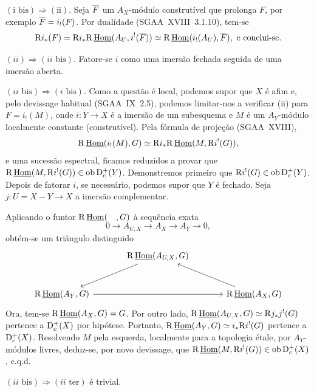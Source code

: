 $(\text{i~bis}) \Rightarrow (\text{ii})$. Seja $\overline{F}$ um $A_X$-módulo construtível que prolonga $F$, por exemplo $\overline{F} = i_{!}(F)$. Por dualidade (SGAA~XVIII~3.1.10), tem-se
\[
\mathrm{R} i_{*}(F) = \mathrm{R} i_{*} \mathrm{R}\,\underline{\operatorname{Hom}}(A_U, i^{!}(\overline{F})) \simeq \mathrm{R}\,\underline{\operatorname{Hom}}(i_{!}(A_U), \overline{F}), \text{ e conclui-se.}
\]

$(ii) \Rightarrow (ii\text{~bis})$. Fatore-se $i$ como uma imersão fechada seguida de uma imersão aberta.

$(ii\text{~bis}) \Rightarrow (i\text{~bis})$. Como a questão é local, podemos supor que $X$ é afim e, pelo devissage habitual (SGAA~IX~2.5), podemos limitar-nos a verificar (ii) para $F = i_{!}(M)$, onde $i : Y \to X$ é a imersão de um subesquema e $M$ é um $A_Y$-módulo localmente constante (construtível). Pela fórmula de projeção (SGAA~XVIII),
\[
\mathrm{R}\,\underline{\operatorname{Hom}}(i_{!}(M), G) \simeq \mathrm{R} i_{*} \mathrm{R}\,\underline{\operatorname{Hom}}(M, \mathrm{R} i^{!}(G)),
\]
e uma sucessão espectral, ficamos reduzidos a provar que $\mathrm{R}\,\underline{\operatorname{Hom}}(M, \mathrm{R} i^{!}(G)) \in \operatorname{ob} \mathrm{D}_c^{+}(Y)$. Demonstremos primeiro que $\mathrm{R} i^{!}(G) \in \operatorname{ob} \mathrm{D}_c^{+}(Y)$. Depois de fatorar $i$, se necessário, podemos supor que $Y$ é fechado. Seja $j : U = X - Y \to X$ a imersão complementar.

Aplicando o funtor $\mathrm{R}\,\underline{\operatorname{Hom}}(\quad, G)$ à sequência exata
\[
0 \longrightarrow A_{U,X} \longrightarrow A_X \longrightarrow A_Y \longrightarrow 0,
\]
obtém-se um triângulo distinguido
\[
\begin{tikzcd}[column sep=large,row sep=large]
& \R\,\underline{\Hom}(A_{U,X}, G) \arrow[dl] & \\
\R\,\underline{\Hom}(A_Y, G) \arrow[rr] & & \R\,\underline{\Hom}(A_X, G) \arrow[ul]
\end{tikzcd}
\]
Ora, tem-se $\mathrm{R}\,\underline{\operatorname{Hom}}(A_X, G) = G$. Por outro lado, $\mathrm{R}\,\underline{\operatorname{Hom}}(A_{U,X}, G) \simeq \mathrm{R} j_{*} j^{!}(G)$ pertence a $\mathrm{D}_c^{+}(X)$ por hipótese. Portanto, $\mathrm{R}\,\underline{\operatorname{Hom}}(A_Y, G) \simeq i_{*} \mathrm{R} i^{!}(G)$ pertence a $\mathrm{D}_c^{+}(X)$. Resolvendo $M$ pela esquerda, localmente para a topologia étale, por $A_Y$-módulos livres, deduz-se, por novo devissage, que $\mathrm{R}\,\underline{\operatorname{Hom}}(M, \mathrm{R} i^{!}(G)) \in \operatorname{ob} \mathrm{D}_c^{+}(X)$, c.q.d.

$(ii\text{~bis}) \Rightarrow (ii\text{~ter})$ é trivial.


